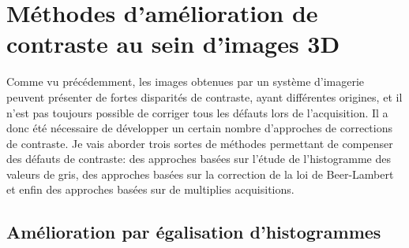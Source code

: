\documentclass[\main/main.tex]{subfiles}
\begin{document}
            
\section{Méthodes d'amélioration de contraste au sein d'images 3D}

%
Comme vu précédemment, les images obtenues par un système d'imagerie peuvent présenter de fortes disparités de contraste, ayant différentes origines, et il n'est pas toujours possible de corriger tous les défauts lors de l'acquisition.
%
Il a donc été nécessaire de développer un certain nombre d'approches de corrections de contraste.
%
Je vais aborder trois sortes de méthodes permettant de compenser des défauts de contraste: des approches basées sur l'étude de l'histogramme des valeurs de gris, des approches basées sur la correction de la loi de Beer-Lambert et enfin des approches basées sur de multiplies acquisitions.

\subsection{Amélioration par égalisation d'histogrammes}
\end{document}
